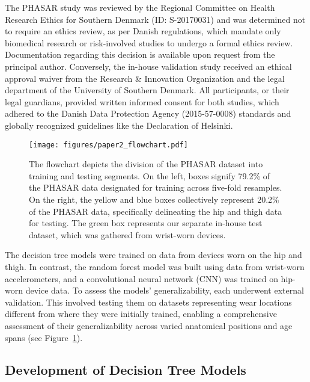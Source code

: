 \documentclass[
  10pt,
]{scrbook}
\begin{document}
The PHASAR study was reviewed by the Regional Committee on Health
Research Ethics for Southern Denmark (ID: S-20170031) and was determined
not to require an ethics review, as per Danish regulations, which
mandate only biomedical research or risk-involved studies to undergo a
formal ethics review. Documentation regarding this decision is available
upon request from the principal author. Conversely, the in-house
validation study received an ethical approval waiver from the Research
\& Innovation Organization and the legal department of the University of
Southern Denmark. All participants, or their legal guardians, provided
written informed consent for both studies, which adhered to the Danish
Data Protection Agency (2015-57-0008) standards and globally recognized
guidelines like the Declaration of Helsinki.

\begin{figure}

{\centering \texttt{[image: figures/paper2\_flowchart.pdf]}

}

\caption{\label{fig-paper2_flowchart}The flowchart depicts the division
of the PHASAR dataset into training and testing segments. On the left,
boxes signify 79.2\% of the PHASAR data designated for training across
five-fold resamples. On the right, the yellow and blue boxes
collectively represent 20.2\% of the PHASAR data, specifically
delineating the hip and thigh data for testing. The green box represents
our separate in-house test dataset, which was gathered from wrist-worn
devices.}

\end{figure}

The decision tree models were trained on data from devices worn on the
hip and thigh. In contrast, the random forest model was built using data
from wrist-worn accelerometers, and a convolutional neural network (CNN)
was trained on hip-worn device data. To assess the models'
generalizability, each underwent external validation. This involved
testing them on datasets representing wear locations different from
where they were initially trained, enabling a comprehensive assessment
of their generalizability across varied anatomical positions and age
spans (see Figure~\ref{fig-paper2_flowchart}).

\hypertarget{development-of-decision-tree-models}{%
\subsection{Development of Decision Tree
Models}\label{development-of-decision-tree-models}}
\end{document}
